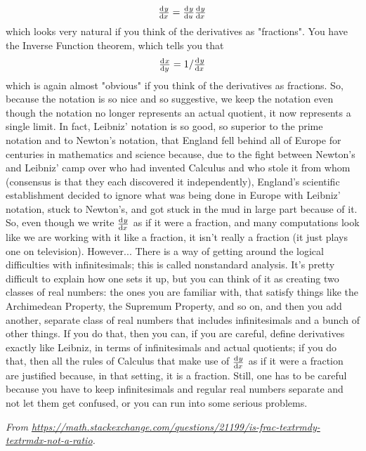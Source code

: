 \documentclass{exam}
\theoremstyle{definition}
\theoremstyle{break}
\begin{document}
\begin{displaymath}
  \od{y}{x} = \od{y}{u} \od{y}{x}
\end{displaymath}
which looks very natural if you think of the derivatives as "fractions". You have the Inverse Function theorem, which tells you that
\begin{displaymath}
  \od{x}{y} = 1/\od{y}{x}
\end{displaymath}
which is again almost "obvious" if you think of the derivatives as fractions. So, because the notation is so nice and so suggestive, we keep the notation even though the notation no longer represents an actual quotient, it now represents a single limit. In fact, Leibniz' notation is so good, so superior to the prime notation and to Newton's notation, that England fell behind all of Europe for centuries in mathematics and science because, due to the fight between Newton's and Leibniz' camp over who had invented Calculus and who stole it from whom (consensus is that they each discovered it independently), England's scientific establishment decided to ignore what was being done in Europe with Leibniz' notation, stuck to Newton's, and got stuck in the mud in large part because of it.
So, even though we write $ \od{y}{x} $ as if it were a fraction, and many computations look like we are working with it like a fraction, it isn't really a fraction (it just plays one on television).
However... There is a way of getting around the logical difficulties with infinitesimals; this is called nonstandard analysis. It's pretty difficult to explain how one sets it up, but you can think of it as creating two classes of real numbers: the ones you are familiar with, that satisfy things like the Archimedean Property, the Supremum Property, and so on, and then you add another, separate class of real numbers that includes infinitesimals and a bunch of other things. If you do that, then you can, if you are careful, define derivatives exactly like Leibniz, in terms of infinitesimals and actual quotients; if you do that, then all the rules of Calculus that make use of $ \od{y}{x} $ as if it were a fraction are justified because, in that setting, it is a fraction. Still, one has to be careful because you have to keep infinitesimals and regular real numbers separate and not let them get confused, or you can run into some serious problems.

\small\textit{From \url{https://math.stackexchange.com/questions/21199/is-frac-textrmdy-textrmdx-not-a-ratio}.}
\end{document}
